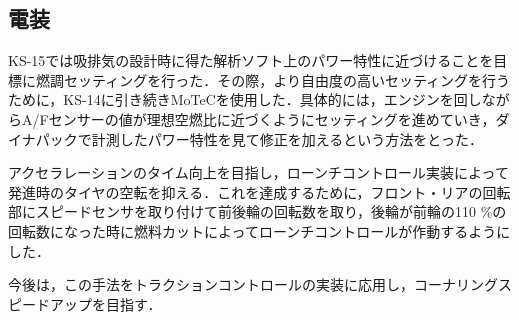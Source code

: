 \subsection{電装}
KS-15では吸排気の設計時に得た解析ソフト上のパワー特性に近づけることを目標に燃調セッティングを行った．その際，より自由度の高いセッティングを行うために，KS-14に引き続きMoTeCを使用した．具体的には，エンジンを回しながらA/Fセンサーの値が理想空燃比に近づくようにセッティングを進めていき，ダイナパックで計測したパワー特性を見て修正を加えるという方法をとった．

アクセラレーションのタイム向上を目指し，ローンチコントロール実装によって発進時のタイヤの空転を抑える．これを達成するために，フロント・リアの回転部にスピードセンサを取り付けて前後輪の回転数を取り，後輪が前輪の110 \%の回転数になった時に燃料カットによってローンチコントロールが作動するようにした．

今後は，この手法をトラクションコントロールの実装に応用し，コーナリングスピードアップを目指す．
